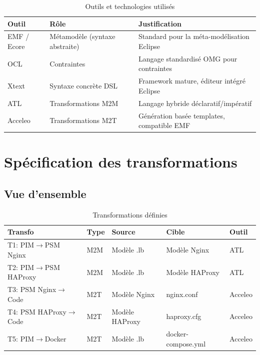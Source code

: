 \documentclass[12pt,a4paper]{report}
\begin{document}
\begin{table}[H]
\centering
\caption{Outils et technologies utilisés}
\begin{tabular}{|p{3cm}|p{4cm}|p{6cm}|}
\hline
\textbf{Outil} & \textbf{Rôle} & \textbf{Justification} \\
\hline
EMF / Ecore & Métamodèle (syntaxe abstraite) & Standard pour la méta-modélisation Eclipse \\
\hline
OCL & Contraintes & Langage standardisé OMG pour contraintes \\
\hline
Xtext & Syntaxe concrète DSL & Framework mature, éditeur intégré Eclipse \\
\hline
ATL & Transformations M2M & Langage hybride déclaratif/impératif \\
\hline
Acceleo & Transformations M2T & Génération basée templates, compatible EMF \\
\hline
\end{tabular}
\end{table}

\chapter{Spécification des transformations}

\section{Vue d'ensemble}

\begin{table}[H]
\centering
\caption{Transformations définies}
\begin{tabular}{|p{2.5cm}|p{2cm}|p{3cm}|p{3cm}|p{1.5cm}|}
\hline
\textbf{Transfo} & \textbf{Type} & \textbf{Source} & \textbf{Cible} & \textbf{Outil} \\
\hline
T1: PIM$\rightarrow$PSM Nginx & M2M & Modèle .lb & Modèle Nginx & ATL \\
\hline
T2: PIM$\rightarrow$PSM HAProxy & M2M & Modèle .lb & Modèle HAProxy & ATL \\
\hline
T3: PSM Nginx$\rightarrow$Code & M2T & Modèle Nginx & nginx.conf & Acceleo \\
\hline
T4: PSM HAProxy$\rightarrow$Code & M2T & Modèle HAProxy & haproxy.cfg & Acceleo \\
\hline
T5: PIM$\rightarrow$Docker & M2T & Modèle .lb & docker-compose.yml & Acceleo \\
\hline
\end{tabular}
\end{table}
\end{document}
